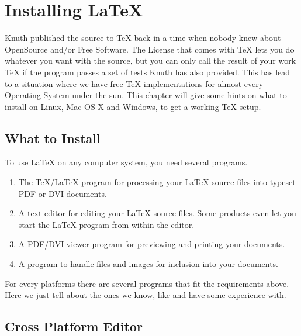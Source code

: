 \appendix
\chapter{Installing \LaTeX}
\begin{intro}
Knuth published the source to \TeX{} back in a time when nobody knew
about OpenSource and/or Free Software. The License that comes with \TeX{}
lets you do whatever you want with the source, but you can only call the
result of your work \TeX{} if the program passes a set of tests Knuth has
also provided. This has lead to a situation where we have free \TeX{}
implementations for almost every Operating System under the sun. This chapter
will give some hints on what to install on Linux, Mac OS X and Windows, to
get a working \TeX{} setup.
\end{intro}

\section{What to Install}

To use \LaTeX{} on any computer system, you need several programs.

\begin{enumerate}

\item The \TeX{}/\LaTeX{} program for processing your \LaTeX{} source files
into typeset PDF or DVI documents.

\item A text editor for editing your \LaTeX{} source files. Some products even let
you start the \LaTeX{} program from within the editor.

\item A PDF/DVI viewer program for previewing and printing your
documents.

\item A program to handle \PSi{} files and images for inclusion into
your documents.

\end{enumerate}

For every platforms there are several programs that fit the requirements above.
Here we just tell about the ones we know, like and have some experience
with.

\section{Cross Platform Editor}
\label{sec:texmaker}


